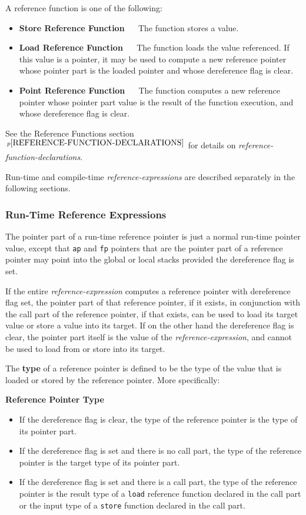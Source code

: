 \documentclass[12pt]{article}
\newcommand{\key}[1]{{\rm \bfseries #1}}
\newcommand{\pagnote}[1]{$\,^{p\pageref{#1}}$}
\begin{document}
A reference function is one of the following:
\begin{itemize}
\item \key{Store Reference Function} ~~
The function stores a value.
\item \key{Load Reference Function} ~~
The function loads the value referenced.
If this value is a pointer, it may be used to compute a new reference pointer
whose pointer part is the loaded pointer and whose
dereference flag is clear.
\item \key{Point Reference Function} ~~
The function computes a new reference pointer whose pointer part value is
the result of the function execution, and whose dereference flag is
clear.
\end{itemize}

See the Reference Functions section\pagnote{REFERENCE-FUNCTION-DECLARATIONS}
for details on {\em reference-function-declarations}.

Run-time and compile-time {\em reference-expressions} are described
separately in the following sections.

\subsubsection{Run-Time Reference Expressions}
\label{RUN-TIME-REFERENCE-EXPRESSIONS}

The pointer part of a run-time reference pointer is just
a normal run-time pointer value, except that
{\tt ap} and {\tt fp} pointers that are the pointer part
of a reference pointer may point
into the global or local stacks provided the dereference flag is set.

If the entire {\em reference-expression} computes a reference pointer
with dereference flag set, the pointer part of that reference pointer,
if it exists,
in conjunction with the call part of the reference pointer, if that exists,
can be used to load its target value or store a value into its target.
If on the other hand the dereference flag is clear, the pointer part
itself is the value of the {\em reference-expression}, and cannot
be used to load from or store into its target.

The \key{type} of a reference pointer
is defined to be the type of the value
that is loaded or stored by the reference pointer.  More specifically:

\bigskip

\centerline{\bf Reference Pointer Type}\label{REFERENCE-POINTER-TYPE}
\begin{itemize}
\item If the dereference flag is clear, the type of the reference pointer
is the type of its pointer part.
\item If the dereference flag is set and there is no call part,
the type of the reference pointer is the target type of its pointer part.
\item If the dereference flag is set and there is a call part,
the type of the reference pointer is the result type of a {\tt load}
reference function declared in the call part or the input type of a {\tt store}
function declared in the call part.
\end{itemize}
\end{document}
